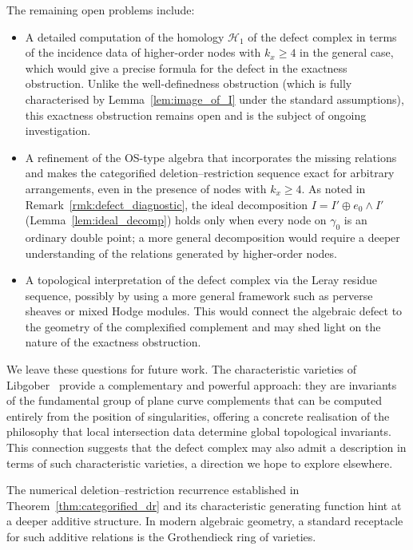 \documentclass[article,11pt]{amsart} \numberwithin{equation}{section}
\numberwithin{equation}{section}
\begin{document}
{\begin{rk}
	The remaining open problems include:
	\begin{itemize}
		\item A detailed computation of the homology $\mathcal H_1$ of the defect complex 
		in terms of the incidence data of higher-order nodes with $k_x\ge 4$ in the 
		general case, which would give a precise formula for the defect in the exactness 
		obstruction. Unlike the well-definedness obstruction (which is fully characterised 
		by Lemma~\ref{lem:image_of_I} under the standard assumptions), this exactness 
		obstruction remains open and is the subject of ongoing investigation.
		
		\item A refinement of the OS-type algebra that incorporates the missing relations 
		and makes the categorified deletion--restriction sequence exact for arbitrary 
		arrangements, even in the presence of nodes with $k_x\ge 4$. As noted in 
		Remark~\ref{rmk:defect_diagnostic}, the ideal decomposition 
		$I=I'\oplus e_0\wedge I'$ (Lemma~\ref{lem:ideal_decomp}) holds only when every 
		node on $\gamma_0$ is an ordinary double point; a more general decomposition 
		would require a deeper understanding of the relations generated by higher-order nodes.
		
		\item A topological interpretation of the defect complex via the Leray residue 
		sequence, possibly by using a more general framework such as perverse sheaves 
		or mixed Hodge modules. This would connect the algebraic defect to the geometry 
		of the complexified complement and may shed light on the nature of the exactness 
		obstruction.
	\end{itemize}
	
	We leave these questions for future work. The characteristic varieties of 
	Libgober~\cite{Libgober2001} provide a complementary and powerful approach: they 
	are invariants of the fundamental group of plane curve complements that can be 
	computed entirely from the position of singularities, offering a concrete realisation 
	of the philosophy that local intersection data determine global topological invariants. 
	This connection suggests that the defect complex may also admit a description in 
	terms of such characteristic varieties, a direction we hope to explore elsewhere.
\end{rk}

The numerical deletion–restriction recurrence established in
Theorem~\ref{thm:categorified_dr} and its characteristic generating
function hint at a deeper additive structure. In modern algebraic
geometry, a standard receptacle for such additive relations is the
Grothendieck ring of varieties.

}
\end{document}
